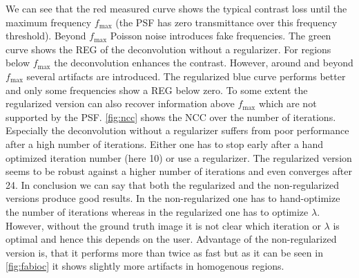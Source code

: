 \documentclass{juliacon}
\begin{document}
        We can see that the red measured curve shows the typical contrast loss until the maximum frequency $f_\textrm{max}$ (the PSF has
            zero transmittance over this frequency threshold).
        Beyond $f_\textrm{max}$ Poisson noise introduces fake frequencies.
        The green curve shows the REG of the deconvolution without a regularizer. 
        For regions below  $f_\textrm{max}$
        the deconvolution enhances the contrast. However, around and beyond $f_\textrm{max}$ several artifacts are introduced.
        The regularized blue curve performs better and only some frequencies show a REG below zero.
        To some extent the regularized version can also recover information above $f_\textrm{max}$ which are not supported by the PSF.
        \autoref{fig:ncc} shows the NCC over the number of iterations.
        Especially the deconvolution without a regularizer suffers from poor performance after a high number of iterations.
        Either one has to stop early after a hand optimized iteration number (here 10) or use a regularizer.
        The regularized version seems to be robust against a higher number of iterations and even converges after 24.
        In conclusion we can say that both the regularized and the non-regularized versions produce good results. 
        In the non-regularized one has to hand-optimize the number of iterations whereas in the regularized one has to optimize $\lambda$.
        However, without the ground truth image it is not clear which iteration or $\lambda$ is optimal and hence
        this depends on the user.
        Advantage of the non-regularized version is, that it performs more than twice as fast but as it can be seen in \autoref{fig:fabioc} 
        it shows slightly more artifacts in homogenous regions.
\end{document}
